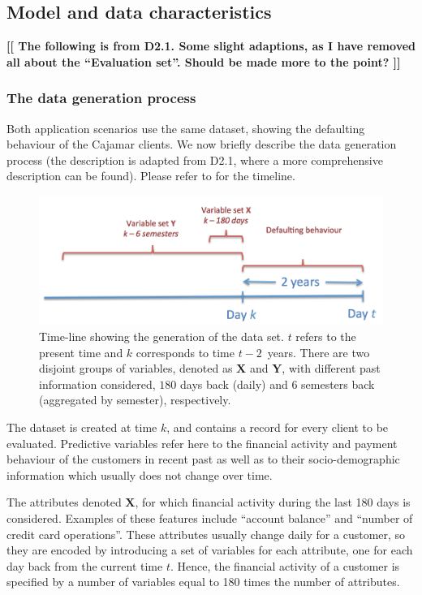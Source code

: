 \documentclass{article}
\theoremstyle{theorem}
\theoremstyle{definition}
\newcommand{\X}{\mathbf{X}}
\newcommand{\Y}{\mathbf{Y}}
\newcommand{\comment}[1]{ \begin{center}{\bf [[ #1 ]]}\end{center}}
\begin{document}
\subsection{Model and data characteristics}

\comment{The following is from D2.1. Some slight adaptions, as I have removed all about the ``Evaluation set''. Should be made more to the point?}


\subsubsection{The data generation process}

Both application scenarios use the same dataset, showing the defaulting behaviour of the Cajamar clients. We now briefly describe the data generation process (the description is adapted from D2.1, where a more comprehensive description can be found). Please refer to  for the timeline. 


\begin{figure}[ht!]
\centering
\includegraphics[scale=0.35]{figures/CajamarTimeLineReduced}
\caption{\label{fig:CajaMarTimeLineReduced}Time-line showing the generation of the data set. $t$ refers to the present time and $k$ corresponds to time $t-2$\ years. There are two disjoint groups of variables, denoted as $\X$ and $\Y$, with different past information considered, $180$ days back (daily) and $6$ semesters back (aggregated by semester), respectively.}
\end{figure}


The dataset is created at time $k$,  and contains a record for every client to be evaluated. 
Predictive variables refer here to the financial activity and payment behaviour of the customers in recent past as well as to their socio-demographic information which usually does not change over time. 

The  attributes denoted $\X$, for which financial activity  during the last 180 days is considered. Examples of these features include ``account balance'' and ``number of credit card operations''. 
These attributes usually change daily for a customer, so they are encoded by introducing a set of variables for each attribute, one for each day back from the current time $t$. 
Hence, the financial activity of a customer is specified by a number of variables equal to 180 times the number of attributes. 
\end{document}
